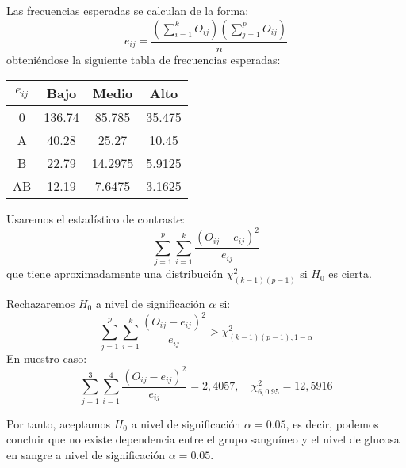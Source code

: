 \begin{exercise}
    Las frecuencias esperadas se calculan de la forma:
    $$e_{ij} = \frac{(\sum_{i=1}^k O_{ij})(\sum_{j=1}^p O_{ij})}{n}$$
    obteniéndose la siguiente tabla de frecuencias esperadas:
    \begin{center}
        \begin{tabular}{| c | c c c |}
            \hline
            $e_{ij}$ & Bajo   & Medio   & Alto   \\
            \hline
            0        & 136.74 & 85.785  & 35.475 \\
            A        & 40.28  & 25.27   & 10.45  \\
            B        & 22.79  & 14.2975 & 5.9125 \\
            AB       & 12.19  & 7.6475  & 3.1625 \\
            \hline
        \end{tabular}
    \end{center}

    Usaremos el estadístico de contraste:
    $$\sum_{j=1}^p \sum_{i=1}^k \frac{(O_{ij}-e_{ij})^2}{e_{ij}}$$
    que tiene aproximadamente una distribución $\chi^2_{(k-1)(p-1)}$ si $H_0$ es cierta.

    Rechazaremos $H_0$ a nivel de significación $\alpha$ si:
    $$\sum_{j=1}^p \sum_{i=1}^k \frac{(O_{ij}-e_{ij})^2}{e_{ij}} > \chi^2_{(k-1)(p-1), 1-\alpha}$$
    En nuestro caso:
    $$\sum_{j=1}^3 \sum_{i=1}^4 \frac{(O_{ij}-e_{ij})^2}{e_{ij}} = 2,4057, \quad \chi^2_{6, 0.95} = 12,5916$$

    Por tanto, aceptamos $H_0$ a nivel de significación $\alpha = 0.05$, es decir, podemos concluir que no existe dependencia entre el grupo sanguíneo y el nivel de glucosa en sangre a nivel de significación $\alpha = 0.05$.
\end{exercise}